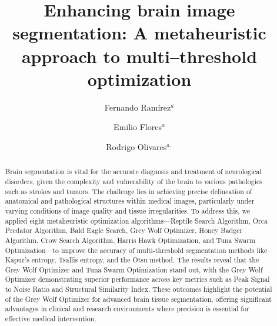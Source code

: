 \documentclass{elsarticle}
\def\corref#1{}%
\begin{document}
\begin{frontmatter}

\title{Enhancing brain image segmentation: A metaheuristic approach to multi--threshold optimization}





\author{Fernando Ram\'irez$^{a}$}

\author{Emilio Flores$^{a}$}

\author{Rodrigo Olivares\corref{cor}$^{a,}$}

\address{$^{a}$Escuela de Ingenier\'ia Inform\'atica, Universidad de Valpara\'iso, 2362905, Valpara\'iso, Chile.}

\begin{abstract}

Brain segmentation is vital for the accurate diagnosis and treatment of neurological disorders, given the complexity and vulnerability of the brain to various pathologies such as strokes and tumors. The challenge lies in achieving precise delineation of anatomical and pathological structures within medical images, particularly under varying conditions of image quality and tissue irregularities. To address this, we applied eight metaheuristic optimization algorithms---Reptile Search Algorithm, Orca Predator Algorithm, Bald Eagle Search, Grey Wolf Optimizer, Honey Badger Algorithm, Crow Search Algorithm, Harris Hawk Optimization, and Tuna Swarm Optimization---to improve the accuracy of multi-threshold segmentation methods like Kapur’s entropy, Tsallis entropy, and the Otsu method. The results reveal that the Grey Wolf Optimizer and Tuna Swarm Optimization stand out, with the Grey Wolf Optimizer demonstrating superior performance across key metrics such as Peak Signal to Noise Ratio and Structural Similarity Index. These outcomes highlight the potential of the Grey Wolf Optimizer for advanced brain tissue segmentation, offering significant advantages in clinical and research environments where precision is essential for effective medical intervention.


\end{abstract}
\end{frontmatter}
\end{document}
